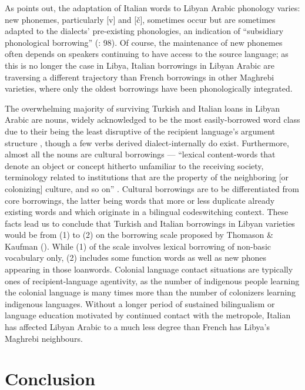 \documentclass[output=paper]{langsci/langscibook}
\begin{document}
  As \citet{Danna2018phonetic} points out, the adaptation of Italian words to Libyan Arabic phonology varies: new phonemes, particularly  [v] and [č], sometimes occur but are sometimes adapted to the dialects’ pre-existing phonologies, an indication of “subsidiary phonological borrowing” (\citealt{VanCoetsem1988}: 98). Of course, the maintenance of new phonemes often depends on speakers continuing to have access to the source language; as this is no longer the case in Libya, Italian borrowings in Libyan Arabic are traversing a different trajectory than French borrowings in other Maghrebi varieties, where only the oldest borrowings have been phonologically integrated.

  The overwhelming majority of surviving Turkish and Italian loans in Libyan Arabic are nouns, widely acknowledged to be the most easily-borrowed word class due to their being the least disruptive of the recipient language’s argument structure \citep{Myers-Scotton2002}, though a few verbs derived dialect-internally do exist. Furthermore, almost all the nouns are cultural borrowings — “lexical content-words that denote an object or concept hitherto unfamiliar to the receiving society, terminology related to institutions that are the property of the neighboring [or colonizing] culture, and so on” \citep[210]{Matras2011universals}. Cultural borrowings are to be differentiated from core borrowings, the latter being words that more or less duplicate already existing words and which originate in a bilingual codeswitching context. These facts lead us to conclude that Turkish and Italian borrowings in Libyan varieties would be from (1) to (2) on the borrowing scale proposed by Thomason \& Kaufman (\citeyear[78–83]{ThomasonKaufman1988}). While (1) of the scale involves lexical borrowing of non-basic vocabulary only, (2) includes some function words as well as new phones appearing in those loanwords. Colonial language contact situations are typically ones of recipient-language agentivity, as the number of indigenous people learning the colonial language is many times more than the number of colonizers learning indigenous languages. Without a longer period of sustained bilingualism or language education motivated by continued contact with the metropole, Italian has affected Libyan Arabic to a much less degree than French has Libya's Maghrebi neighbours.

\section{Conclusion}
\end{document}
